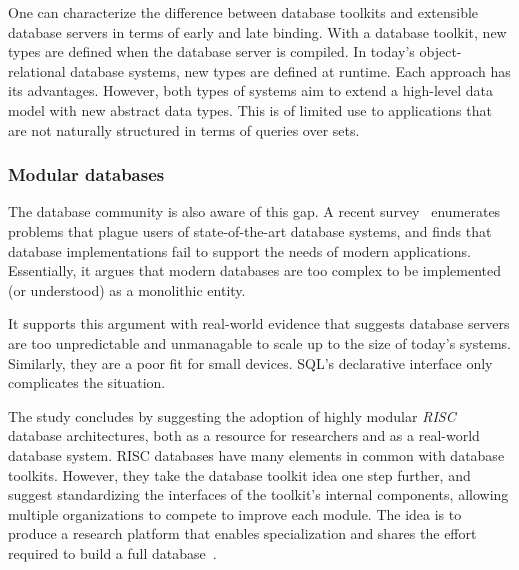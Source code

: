 \documentclass[letterpaper,twocolumn,10pt]{article}
\begin{document}
One can characterize the difference between database toolkits and
extensible database servers in terms of early and late binding.  With
a database toolkit, new types are defined when the database server is
compiled.  In today's object-relational database systems, new types
are defined at runtime.  Each approach has its advantages.  However,
both types of systems aim to extend a high-level data model with new
abstract data types.  This is of limited use to applications that are 
not naturally structured in terms of queries over sets.

\subsubsection{Modular databases}

The database community is also aware of this gap.  A recent
survey~\cite{riscDB} enumerates problems that plague users of
state-of-the-art database systems, and finds that database
implementations fail to support the needs of modern applications.
Essentially, it argues that modern databases are too complex to be
implemented (or understood) as a monolithic entity.

It supports this argument with real-world evidence that suggests
database servers are too unpredictable and unmanagable to
scale up to the size of today's systems.  Similarly, they are a poor fit
for small devices.  SQL's declarative interface only complicates the
situation.



The study concludes by suggesting the adoption of highly modular {\em
RISC} database architectures, both as a resource for researchers and
as a real-world database system.  RISC databases have many elements in
common with database toolkits.  However, they take the database
toolkit idea one step further, and suggest standardizing the
interfaces of the toolkit's internal components, allowing multiple
organizations to compete to improve each module.  The idea is to
produce a research platform that enables specialization and shares the
effort required to build a full database~\cite{riscDB}.
\end{document}
